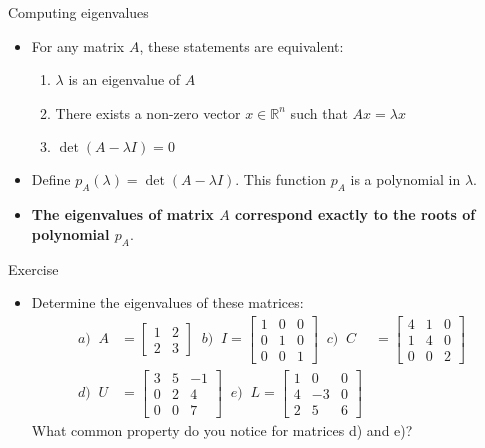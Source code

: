 \begin{frame}{Computing eigenvalues}
   \begin{itemize}
       \item For any matrix $A$, these statements are equivalent:
        \begin{enumerate}
            \item $\lambda$ is an eigenvalue of $A$
            \item There exists a non-zero vector $x\in \mathbb{R}^n$ such that $Ax = \lambda x$
            \item $\det(A-\lambda I)=0$
       \end{enumerate}
    \item Define $p_A(\lambda) = \det(A-\lambda I)$. This function $p_A$ is a polynomial in $\lambda$.
    \item \textbf{The eigenvalues of matrix $A$ correspond exactly to the roots of polynomial $p_A$}.
    \end{itemize}
\end{frame}
\begin{frame}{Exercise}
\begin{itemize}
\item Determine the eigenvalues of these matrices:
\begin{align}
    a)\;\;   A &= \begin{bmatrix}
        1 & 2 \\
        2 & 3
    \end{bmatrix}\;\;  b)\;\;I = \begin{bmatrix}
         1 & 0 & 0 \\
         0 & 1 & 0 \\
         0 & 0 & 1
     \end{bmatrix}\;\; c)\;\;  C &= \begin{bmatrix}
    4 & 1 & 0 \\
    1 & 4 & 0 \\
    0 & 0 & 2
\end{bmatrix}\\
d) \;\; U & = \begin{bmatrix}
3 & 5 & -1 \\
0 & 2 & 4 \\
0 & 0 & 7
\end{bmatrix}\;\; e)\;\; L = \begin{bmatrix}
1 & 0 & 0 \\
4 & -3 & 0 \\
2 & 5 & 6
\end{bmatrix}
\end{align}
What common property do you notice for matrices d) and e)?
\end{itemize}
\end{frame}

